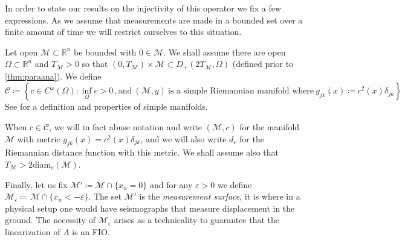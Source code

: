\documentclass[
	fontsize=11pt, 
	twoside=false, 
	abstract=true, 
	a4paper,
]{scrartcl}
\newcommand{\eps}{\varepsilon}
\newcommand{\RR}{\mathbb{R}}
\begin{document}
In order to state our results on the injectivity of this operator we fix a few expressions. As we assume that measurements are made in a bounded set over a finite amount of time we will restrict ourselves to this situation. 

Let open $\mathcal{M}\subset \RR^n$ be bounded with $0\in\mathcal{M}$. We shall assume there are open $\Omega\subset \RR^n$ and $T_{\mathcal{M}} > 0$ so that $(0,T_{\mathcal{M}})\times \mathcal{M}\subset D_+(2T_{\mathcal{M}},\Omega)$ (defined prior to \cref{thm:paraana}). We define
%
%
\begin{equation}\label{eq:definecalC}
	\mathcal{C} \coloneqq \left\{c \in C^\omega(\Omega)\colon \inf_{\Omega} c > 0\,,\text{and}\ (\mathcal{M},g)\ \text{is a simple Riemannian manifold where}\ g_{jk}(x) \coloneqq c^2(x)\delta_{jk}\right\}\,.
\end{equation}
See \cite[\S~3.8]{zbMATH07625517} for a definition and properties of simple manifolds. 

When $c \in \mathcal{C}$, we will in fact abuse notation and write $(\mathcal{M},c)$ for the manifold $\mathcal{M}$ with metric $g_{jk}(x) = c^2(x)\delta_{jk}$, and we will also write $d_c$ for the Riemannian distance function with this metric. We shall assume also that $T_{\mathcal{M}} > 2\mathrm{diam}_c(\mathcal{M})$. 



Finally, let us fix $\mathcal{M}' \coloneqq \mathcal{M} \cap \{x_n = 0\}$ and for any $\eps>0$ we define $\mathcal{M}_\eps \coloneqq  \mathcal{M}\cap \{x_n < -\eps\}$. The set $\mathcal{M}'$ is the \emph{measurement surface}, it is where in a physical setup one would have seismographs that measure displacement in the ground. The necessity of $\mathcal{M}_\eps$ arises as a technicality to guarantee that the linearization of $A$ is an FIO.%
\end{document}

